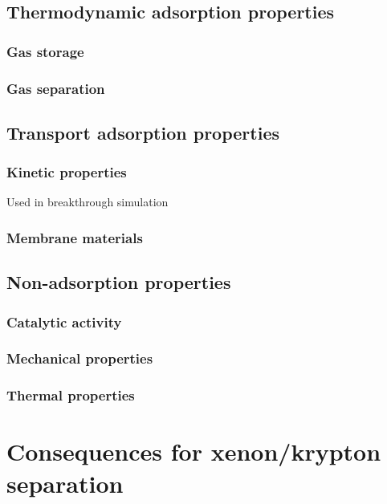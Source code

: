 \documentclass[main]{subfiles}
\begin{document}
\subsection{Thermodynamic adsorption properties}

\subsubsection{Gas storage}

\subsubsection{Gas separation}

\subsection{Transport adsorption properties}

\subsubsection{Kinetic properties}

Used in breakthrough simulation

\subsubsection{Membrane materials}

\subsection{Non-adsorption properties}

\subsubsection{Catalytic activity}

\subsubsection{Mechanical properties}

\subsubsection{Thermal properties}

\section{Consequences for xenon/krypton separation}
\end{document}
